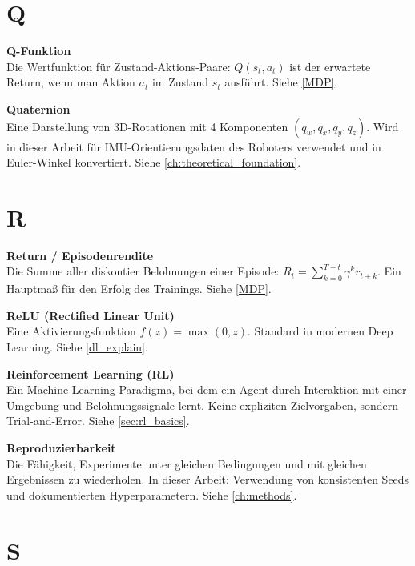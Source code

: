 \section*{Q}

\vspace{0.3cm}
\noindent\textbf{Q-Funktion} \\
Die Wertfunktion für Zustand-Aktions-Paare: $Q(s_t, a_t)$ ist der erwartete Return, wenn man Aktion $a_t$ im Zustand $s_t$ ausführt. Siehe \autoref{MDP}.

\vspace{0.5cm}
\noindent\textbf{Quaternion} \\
Eine Darstellung von 3D-Rotationen mit 4 Komponenten $(q_w, q_x, q_y, q_z)$. Wird in dieser Arbeit für IMU-Orientierungsdaten des Roboters verwendet und in Euler-Winkel konvertiert. Siehe \autoref{ch:theoretical_foundation}.

\section*{R}

\vspace{0.3cm}
\noindent\textbf{Return / Episodenrendite} \\
Die Summe aller diskontier Belohnungen einer Episode: $R_t = \sum_{k=0}^{T-t} \gamma^k r_{t+k}$. Ein Hauptmaß für den Erfolg des Trainings. Siehe \autoref{MDP}.

\vspace{0.5cm}
\noindent\textbf{ReLU (Rectified Linear Unit)} \\
Eine Aktivierungsfunktion $f(z) = \max(0, z)$. Standard in modernen Deep Learning. Siehe \autoref{dl_explain}.

\vspace{0.5cm}
\noindent\textbf{Reinforcement Learning (RL)} \\
Ein Machine Learning-Paradigma, bei dem ein Agent durch Interaktion mit einer Umgebung und Belohnungssignale lernt. Keine expliziten Zielvorgaben, sondern Trial-and-Error. Siehe \autoref{sec:rl_basics}.

\vspace{0.5cm}
\noindent\textbf{Reproduzierbarkeit} \\
Die Fähigkeit, Experimente unter gleichen Bedingungen und mit gleichen Ergebnissen zu wiederholen. In dieser Arbeit: Verwendung von konsistenten Seeds und dokumentierten Hyperparametern. Siehe \autoref{ch:methods}.

\section*{S}


